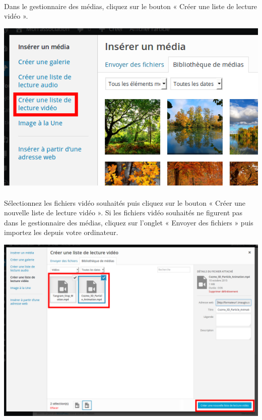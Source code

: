 \documentclass[10pt,a4paper]{article}
\begin{document}
\paragraph{}Dans le gestionnaire des médias, cliquez sur le bouton « Créer une liste de lecture vidéo ».
\begin{center}
\includegraphics[scale=0.3]{img/0128.png}
\end{center}
\paragraph{}Sélectionnez les fichiers vidéo souhaités puis cliquez sur le bouton « Créer une nouvelle liste de lecture vidéo ». Si les fichiers vidéo souhaités ne figurent pas dans le gestionnaire des médias, cliquez sur l'onglet « Envoyer des fichiers » puis importez les depuis votre ordinateur.
\begin{center}
\includegraphics[scale=0.25]{img/0129.png}
\end{center}
\newpage
\end{document}
